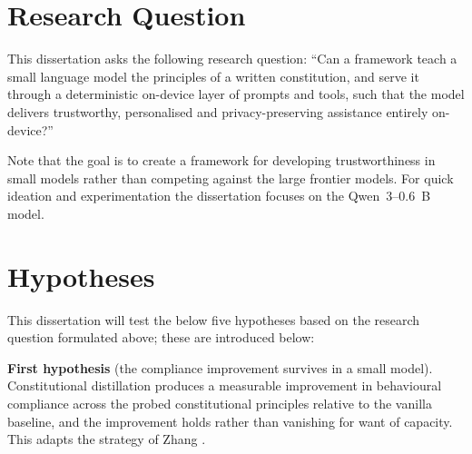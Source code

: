 %
%
%
\section{Research Question}
\label{sec:research-question}

This dissertation asks the following research question: ``Can a framework teach a small language model the principles of a written constitution, and serve it through a deterministic on-device layer of prompts and tools, such that the model delivers trustworthy, personalised and privacy-preserving assistance entirely on-device?''

Note that the goal is to create a framework for developing trustworthiness in small models rather than competing against the large frontier models. For quick ideation and experimentation the dissertation focuses on the Qwen~3--0.6~B model.

\section{Hypotheses}
\label{sec:hypotheses}

This dissertation will test the below five hypotheses based on the research question formulated above; these are introduced below:

\textbf{First hypothesis} (the compliance improvement survives in a small model). Constitutional distillation produces a measurable improvement in behavioural compliance across the probed constitutional principles relative to the vanilla baseline, and the improvement holds rather than vanishing for want of capacity. This adapts the strategy of Zhang \cite{zhang2025constitutioncollapseexploringconstitutional}.

